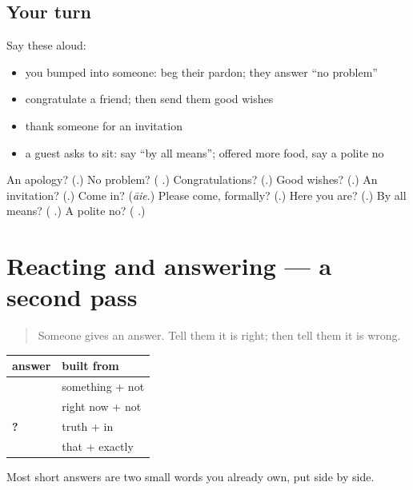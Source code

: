 \subsection*{Your turn}
Say these aloud:

\begin{itemize}
\raggedright
  \item you bumped into someone: beg their pardon; they answer \textquotedblleft{}no problem\textquotedblright{}
  \item congratulate a friend; then send them good wishes
  \item thank someone for an invitation
  \item a guest asks to sit: say \textquotedblleft{}by all means\textquotedblright{}; offered more food, say a polite no
\end{itemize}

\begin{tcolorbox}[breakable,colback=teal!4,colframe=teal!35!black,title={Before you move on}]
An apology? (\textbf{}.) No problem? (\textbf{  }.) Congratulations? (\textbf{}.) Good wishes? (\textbf{}.) An invitation? (\textbf{}.) Come in? (\emph{āie}.) Please come, formally? (\textbf{}.) Here you are? (\textbf{}.) By all means? (\textbf{ }.) A polite no? (\textbf{ }.)
\end{tcolorbox}
\section[(dialogue)]{Reacting and answering — a second pass}

\label{lesson:HI-R115-second-pass-reactions}



\begin{quote}
Someone gives an answer. Tell them it is right; then tell them it is wrong.
\end{quote}

\begin{grammarlens}[title={Grammar Lens: two words you already had, joined}]
\noindent
\begin{tabularx}{\linewidth}{@{}>{\raggedright\arraybackslash}X>{\raggedright\arraybackslash}X@{}}
\toprule
\textbf{answer} & \textbf{built from} \\
\midrule
\textbf{\hi{कुछ} \hi{नहीं}} & something + not \\
\textbf{\hi{अभी} \hi{नहीं}} & right now + not \\
\textbf{\hi{सच} \hi{में}?} & truth + in \\
\textbf{\hi{वही}} & that + exactly \\
\bottomrule
\end{tabularx}

Most short answers are two small words you already own, put side by side.
\end{grammarlens}

